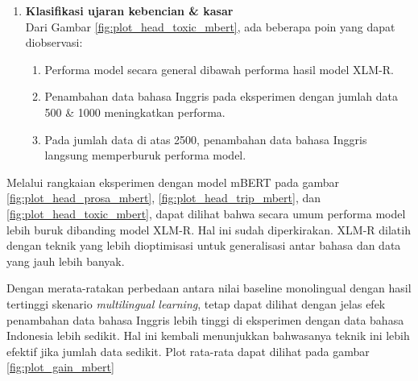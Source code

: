 \begin{enumerate}
            \item \textbf{Klasifikasi ujaran kebencian \& kasar} \\
            Dari Gambar \ref{fig:plot_head_toxic_mbert}, ada beberapa poin yang dapat diobservasi:
            \begin{enumerate}
                \item Performa model secara general dibawah performa hasil model XLM-R.
                \item Penambahan data bahasa Inggris pada eksperimen dengan jumlah data 500 \& 1000  meningkatkan performa.
                \item Pada jumlah data di atas 2500, penambahan data bahasa Inggris langsung memperburuk performa model.
            \end{enumerate}


        \end{enumerate}

        Melalui rangkaian eksperimen dengan model mBERT pada gambar \ref{fig:plot_head_prosa_mbert}, \ref{fig:plot_head_trip_mbert}, dan \ref{fig:plot_head_toxic_mbert}, dapat dilihat bahwa secara umum performa model lebih buruk dibanding model XLM-R. Hal ini sudah diperkirakan. XLM-R dilatih dengan teknik yang lebih dioptimisasi untuk generalisasi antar bahasa dan data yang jauh lebih banyak. 
        
        Dengan merata-ratakan perbedaan antara nilai baseline monolingual dengan hasil tertinggi skenario \textit{multilingual learning}, tetap dapat dilihat dengan jelas efek penambahan data bahasa Inggris lebih tinggi di eksperimen dengan data bahasa Indonesia lebih sedikit. Hal ini kembali menunjukkan bahwasanya teknik ini lebih efektif jika jumlah data sedikit. Plot rata-rata dapat dilihat pada gambar \ref{fig:plot_gain_mbert}

